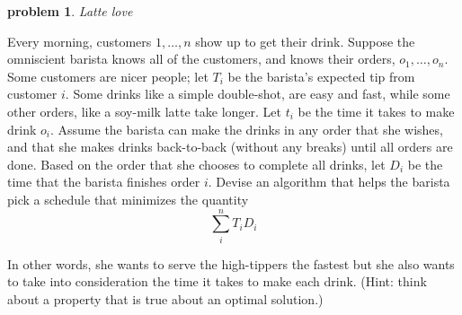 \documentclass[11pt]{article}
\newtheorem{problem}{\sc\color{cit}problem}
\begin{document}
\newpage


\begin{problem}{Latte love}\end{problem}

Every morning, customers $1,\ldots,n$ show up to get their drink.  Suppose the omniscient barista  knows all of the customers, and knows their orders, $o_1,\ldots,o_n$.   Some customers are nicer people; let 
$T_i$ be the barista's expected tip from customer $i$.  Some drinks  like a simple double-shot, are easy and fast, while some other orders, like a soy-milk latte take longer.   Let $t_i$ be the time it takes to make drink $o_i$.
Assume the barista  can make the drinks in any order that she wishes, and that she makes drinks back-to-back (without any breaks) until all orders are done.
Based on the order that she chooses to complete all drinks, 
let $D_i$ be the time that the barista finishes order $i$.  Devise an algorithm that helps the barista pick  a schedule that minimizes the
quantity $$ \sum_{i}^n T_i D_i$$

In other words, she wants to serve the high-tippers the fastest but she also wants to take into consideration the time it takes to make each drink.
(Hint: think about a property that is true about an optimal solution.)
\end{document}
